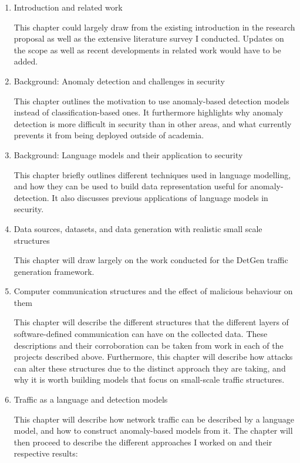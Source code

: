 \documentclass[a4paper,12pt,twoside]{article}
\begin{document}
\begin{enumerate}


\item Introduction and related work

This chapter could largely draw from the existing introduction in the research proposal as well as the extensive literature survey I conducted. Updates on the scope as well as recent developments in related work would have to be added. %

\item Background: Anomaly detection and challenges in security

This chapter outlines the motivation to use anomaly-based detection models instead of classification-based ones. It furthermore highlights why anomaly detection is more difficult in security than in other areas, and what currently prevents it from being deployed outside of academia.

\item Background: Language models and their application to security

This chapter briefly outlines different techniques used in language modelling,  and how they can be used to build data representation useful for anomaly-detection. It also discusses previous applications of language models in security.

\item Data sources, datasets, and data generation with realistic small scale structures

This chapter will draw largely on the work conducted for the DetGen traffic generation framework.

\item Computer communication structures and the effect of malicious behaviour on them

This chapter will describe the different structures that the different layers of software-defined communication can have on the collected data. These descriptions and their corroboration can be taken from work in each of the projects described above. Furthermore, this chapter will describe how attacks can alter these structures due to the distinct approach they are taking, and why it is worth building models that focus on small-scale traffic structures.

\item Traffic as a language and detection models

This chapter will describe how network traffic can be described by a language model, and how to construct anomaly-based models from it. The chapter will then proceed to describe the different approaches I worked on and their respective results:


\end{enumerate}
\end{document}
